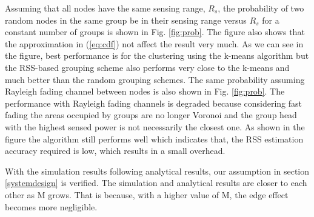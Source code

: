 Assuming that all nodes have the same sensing range, $R_s$, the probability of two random nodes in the same group be in their sensing range versus $R_s$ for a constant number of groups is shown in Fig. \ref{fig:prob}. The figure also shows that the approximation in (\ref{eq:cdf}) not affect the result very much. As we can see in the figure, best performance is for the clustering using the k-means algorithm but the RSS-based grouping scheme also performs very close to the k-means and much better than the random grouping schemes. The same probability assuming Rayleigh fading channel between nodes is also shown in Fig. \ref{fig:prob}. The performance with Rayleigh fading channels is degraded because considering fast fading the areas occupied by groups are no longer Voronoi and the group head with the highest sensed power is not necessarily the closest one. As shown in the figure the algorithm still performs well which indicates that, the RSS estimation accuracy required is low, which results in a small overhead.

With the simulation results following analytical results, our assumption in section \ref{systemdesign} is verified. The simulation and analytical results are closer to each other as M grows. That is because, with a higher value of M, the edge effect becomes more negligible.

